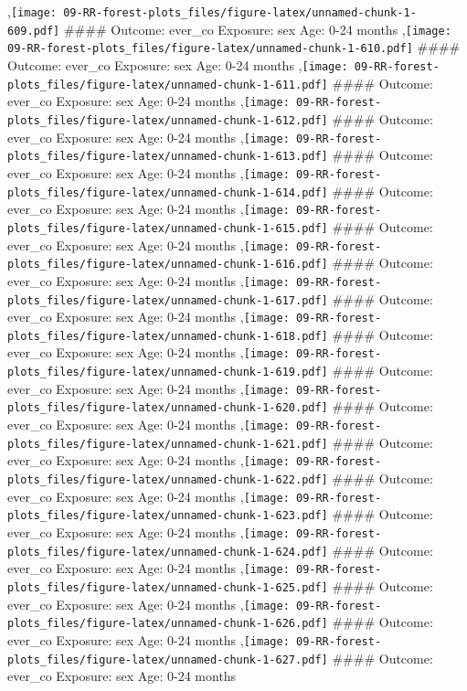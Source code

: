 \documentclass[
  9pt,
]{book}
\begin{document}
,\texttt{[image: 09-RR-forest-plots\_files/figure-latex/unnamed-chunk-1-609.pdf]}
\#\#\#\# Outcome: ever\_co Exposure: sex Age: 0-24 months
,\texttt{[image: 09-RR-forest-plots\_files/figure-latex/unnamed-chunk-1-610.pdf]}
\#\#\#\# Outcome: ever\_co Exposure: sex Age: 0-24 months
,\texttt{[image: 09-RR-forest-plots\_files/figure-latex/unnamed-chunk-1-611.pdf]}
\#\#\#\# Outcome: ever\_co Exposure: sex Age: 0-24 months
,\texttt{[image: 09-RR-forest-plots\_files/figure-latex/unnamed-chunk-1-612.pdf]}
\#\#\#\# Outcome: ever\_co Exposure: sex Age: 0-24 months
,\texttt{[image: 09-RR-forest-plots\_files/figure-latex/unnamed-chunk-1-613.pdf]}
\#\#\#\# Outcome: ever\_co Exposure: sex Age: 0-24 months
,\texttt{[image: 09-RR-forest-plots\_files/figure-latex/unnamed-chunk-1-614.pdf]}
\#\#\#\# Outcome: ever\_co Exposure: sex Age: 0-24 months
,\texttt{[image: 09-RR-forest-plots\_files/figure-latex/unnamed-chunk-1-615.pdf]}
\#\#\#\# Outcome: ever\_co Exposure: sex Age: 0-24 months
,\texttt{[image: 09-RR-forest-plots\_files/figure-latex/unnamed-chunk-1-616.pdf]}
\#\#\#\# Outcome: ever\_co Exposure: sex Age: 0-24 months
,\texttt{[image: 09-RR-forest-plots\_files/figure-latex/unnamed-chunk-1-617.pdf]}
\#\#\#\# Outcome: ever\_co Exposure: sex Age: 0-24 months
,\texttt{[image: 09-RR-forest-plots\_files/figure-latex/unnamed-chunk-1-618.pdf]}
\#\#\#\# Outcome: ever\_co Exposure: sex Age: 0-24 months
,\texttt{[image: 09-RR-forest-plots\_files/figure-latex/unnamed-chunk-1-619.pdf]}
\#\#\#\# Outcome: ever\_co Exposure: sex Age: 0-24 months
,\texttt{[image: 09-RR-forest-plots\_files/figure-latex/unnamed-chunk-1-620.pdf]}
\#\#\#\# Outcome: ever\_co Exposure: sex Age: 0-24 months
,\texttt{[image: 09-RR-forest-plots\_files/figure-latex/unnamed-chunk-1-621.pdf]}
\#\#\#\# Outcome: ever\_co Exposure: sex Age: 0-24 months
,\texttt{[image: 09-RR-forest-plots\_files/figure-latex/unnamed-chunk-1-622.pdf]}
\#\#\#\# Outcome: ever\_co Exposure: sex Age: 0-24 months
,\texttt{[image: 09-RR-forest-plots\_files/figure-latex/unnamed-chunk-1-623.pdf]}
\#\#\#\# Outcome: ever\_co Exposure: sex Age: 0-24 months
,\texttt{[image: 09-RR-forest-plots\_files/figure-latex/unnamed-chunk-1-624.pdf]}
\#\#\#\# Outcome: ever\_co Exposure: sex Age: 0-24 months
,\texttt{[image: 09-RR-forest-plots\_files/figure-latex/unnamed-chunk-1-625.pdf]}
\#\#\#\# Outcome: ever\_co Exposure: sex Age: 0-24 months
,\texttt{[image: 09-RR-forest-plots\_files/figure-latex/unnamed-chunk-1-626.pdf]}
\#\#\#\# Outcome: ever\_co Exposure: sex Age: 0-24 months
,\texttt{[image: 09-RR-forest-plots\_files/figure-latex/unnamed-chunk-1-627.pdf]}
\#\#\#\# Outcome: ever\_co Exposure: sex Age: 0-24 months
\end{document}
